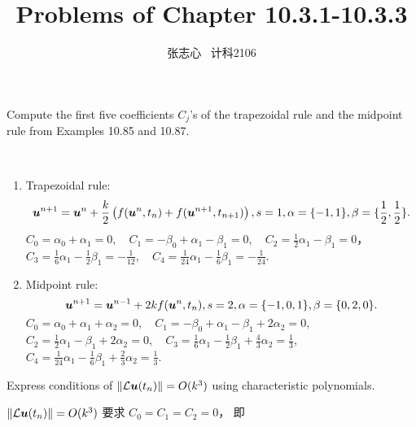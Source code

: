 \documentclass[lang=cn,a4paper,newtx,bibend=bibtex]{elegantpaper}
\title{Problems of Chapter 10.3.1-10.3.3}
\author{张志心 \ 计科2106}
\date{\zhdate{2024/04/08}}
\begin{document}
\maketitle

\begin{prob}[Exercise 10.99]
  Compute the first five coefficients $C_j$'s 
  of the trapezoidal rule and the midpoint rule from
  Examples 10.85 and 10.87.
\end{prob}

\begin{solution}~~\\
\begin{enumerate}[(1)]
  \item Trapezoidal rule:
        \[
           \bm{u}^{n+1} = \bm{u}^n + \frac{k}2 \left(f(\bm{u}^n, t_n) + f(\bm{u}^{n+1}, t_{n+1})\right),
           s = 1, \alpha = \{-1, 1\}, \beta = \{\frac12, \frac12\}.
        \]
        $C_0 = \alpha_0 + \alpha_1 = 0, \quad C_1 = -\beta_0 + \alpha_1 - \beta_1 = 0, \quad 
        C_2 = \frac12 \alpha_1 - \beta_1 = 0$，\\
        $C_3 = \frac16 \alpha_1 - \frac12 \beta_1 = - \frac1{12}, \quad
        C_4 = \frac{1}{24} \alpha_1 - \frac16 \beta_1 = - \frac1{24}$.
  \item Midpoint rule:
        \[
          \bm{u}^{n+1} = \bm{u}^{n-1} + 2k f(\bm{u}^{n}, t_n),s= 2, \alpha = \{-1, 0, 1\}, \beta = \{0, 2, 0\}.
        \]
        $C_0 = \alpha_0 + \alpha_1 + \alpha_2 = 0, \quad C_1 = -\beta_0 + \alpha_1 - \beta_1 + 2\alpha_2 = 0,$\\
        $C_2 = \frac12 \alpha_1 - \beta_1 + 2\alpha_2 = 0, \quad C_3 = \frac16 \alpha_1 - \frac12 \beta_1 + \frac43 \alpha_2 = \frac13$,\\
        $C_4 = \frac1{24}\alpha_1 - \frac16 \beta_1 + \frac23\alpha_2 = \frac13$.
\end{enumerate}
\end{solution}

\begin{prob}[Exercise 10.101]
  Express conditions of $\| \mathcal{L} \bm{u} (t_n)\| = O(k^3)$
  using characteristic polynomials.
\end{prob}

\begin{solution}
  $\| \mathcal{L} \bm{u} (t_n)\| = O(k^3)$ 要求 $C_0 = C_1 = C_2 = 0$，
  即
\end{solution}
\end{document}
